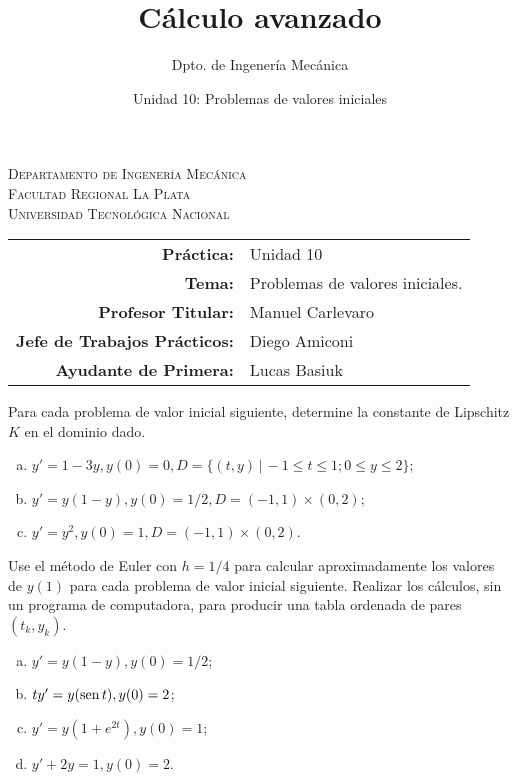 \documentclass[11pt]{article}
\title{Cálculo avanzado}
\author{Dpto. de Ingenería Mecánica}
\date{Unidad 10: Problemas de valores iniciales}
\begin{document}

\begin{center}
\end{center} 

\begin{center}
\vspace{\baselineskip}
\Large{\textsc{Departamento de Ingenería Mecánica}} \\
\textsc{Facultad Regional La Plata} \\
\textsc{Universidad Tecnológica Nacional}
\end{center}


\begin{center}
\begin{tabular}{r l}
    \textbf{Práctica:} & Unidad 10 \\
 \textbf{Tema:} & Problemas de valores iniciales. \\
 \textbf{Profesor Titular:} & Manuel Carlevaro \\
 \textbf{Jefe de Trabajos Prácticos:} & Diego Amiconi \\
 \textbf{Ayudante de Primera:} & Lucas Basiuk 
\end{tabular}\end{center}

\vspace{1em}

\begin{question} %
Para cada problema de valor inicial siguiente, determine la constante de Lipschitz $K$ en el dominio dado.
\begin{enumerate}[a)]
    \item $y' = 1 - 3y, y(0) = 0, D = \{(t, y) \, | \, -1 \leq t \leq 1; 0 \leq y \leq 2 \}$;
    \item $y' = y(1-y), y(0) = 1/2, D = (-1, 1) \times (0, 2)$;
    \item $y' = y^2, y(0) = 1, D = (-1, 1) \times (0, 2)$.
\end{enumerate}
\end{question}

\begin{question} %
Use el método de Euler con $h = 1/4$ para calcular aproximadamente los valores de $y(1)$ para cada problema de valor inicial siguiente. Realizar los cálculos, sin un programa de computadora, para producir una tabla ordenada de pares $(t_k, y_k)$.
\begin{enumerate}[a)]
    \item $y' = y(1-y), y(0) = 1/2$;
    \item $t y' = y(\operatorname{sen} t), y(0) = 2$;
    \item $y' = y(1 + e^{2 t}), y(0) = 1$;
    \item $y' + 2 y = 1, y(0) = 2$.
\end{enumerate}
\end{question}
\end{document}
